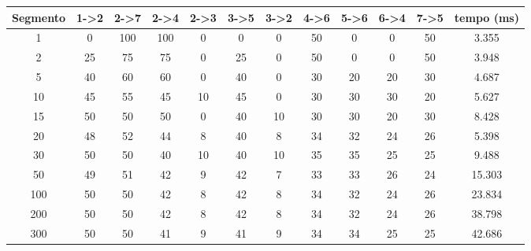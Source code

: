 \scalebox{0.65} {
\begin {tabular}{|c|c|c|c|c|c|c|c|c|c|c|c|}
\hline
Segmento & 1->2 & 2->7 & 2->4 & 2->3 & 3->5 & 3->2 & 4->6 & 5->6 & 6->4 & 7->5 & tempo (ms)\\ \hline
1 & 0 & 100 & 100 & 0 & 0 & 0 & 50 & 0 & 0 & 50 & 3.355\\ \hline
2 & 25 & 75 & 75 & 0 & 25 & 0 & 50 & 0 & 0 & 50 & 3.948\\ \hline
5 & 40 & 60 & 60 & 0 & 40 & 0 & 30 & 20 & 20 & 30 & 4.687\\ \hline
10 & 45 & 55 & 45 & 10 & 45 & 0 & 30 & 30 & 30 & 20 & 5.627\\ \hline
15 & 50 & 50 & 50 & 0 & 40 & 10 & 30 & 30 & 20 & 30 & 8.428\\ \hline
20 & 48 & 52 & 44 & 8 & 40 & 8 & 34 & 32 & 24 & 26 & 5.398\\ \hline
30 & 50 & 50 & 40 & 10 & 40 & 10 & 35 & 35 & 25 & 25 & 9.488\\ \hline
50 & 49 & 51 & 42 & 9 & 42 & 7 & 33 & 33 & 26 & 24 & 15.303\\ \hline
100 & 50 & 50 & 42 & 8 & 42 & 8 & 34 & 32 & 24 & 26 & 23.834\\ \hline
200 & 50 & 50 & 42 & 8 & 42 & 8 & 34 & 32 & 24 & 26 & 38.798\\ \hline
300 & 50 & 50 & 41 & 9 & 41 & 9 & 34 & 34 & 25 & 25 & 42.686\\ \hline

\end{tabular}
}
